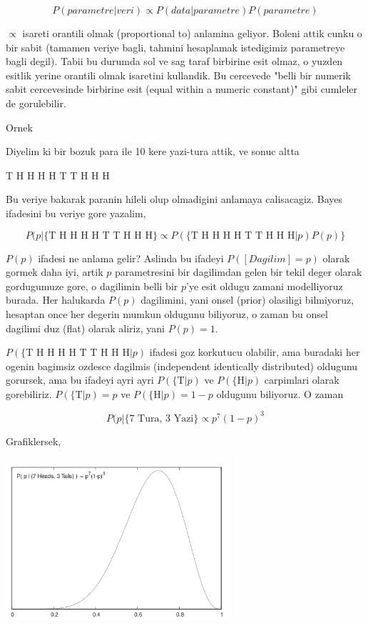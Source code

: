 \documentclass[12pt,fleqn]{article}\usepackage{../common}
\begin{document}
$$ P(parametre | veri ) \propto P(data | parametre)P(parametre) $$

$\propto$ isareti orantili olmak (proportional to) anlamina geliyor. Boleni
attik cunku o bir sabit (tamamen veriye bagli, tahmini hesaplamak
istedigimiz parametreye bagli degil). Tabii bu durumda sol ve sag taraf
birbirine esit olmaz, o yuzden esitlik yerine orantili olmak isaretini
kullandik. Bu cercevede "belli bir numerik sabit cercevesinde birbirine
esit (equal within a numeric constant)" gibi cumleler de gorulebilir. 

Ornek

Diyelim ki bir bozuk para ile 10 kere yazi-tura attik, ve sonuc altta

T H H H H T T H H H

Bu veriye bakarak paranin hileli olup olmadigini anlamaya
calisacagiz. Bayes ifadesini bu veriye gore yazalim,

$$ P(p | \{ \textrm{T H H H H T T H H H} \} \propto 
P(\{ \textrm{T H H H H T T H H H} | p) P(p) \}
$$

$P(p)$ ifadesi ne anlama gelir? Aslinda bu ifadeyi $P([Dagilim] = p)$
olarak gormek daha iyi, artik $p$ parametresini bir dagilimdan gelen bir
tekil deger olarak gordugumuze gore, o dagilimin belli bir $p$'ye esit
oldugu zamani modelliyoruz burada. Her halukarda $P(p)$ dagilimini, yani
onsel (prior) olasiligi bilmiyoruz, hesaptan once her degerin mumkun
oldugunu biliyoruz, o zaman bu onsel dagilimi duz (flat) olarak aliriz,
yani $P(p) = 1$. 

$P(\{\textrm{T H H H H T T H H H} | p)$ ifadesi goz korkutucu olabilir, ama
buradaki her ogenin bagimsiz ozdesce dagilmis (independent identically
distributed) oldugunu gorursek, ama bu ifadeyi ayri ayri
$P(\{\textrm{T}|p)$ ve $P(\{\textrm{H}|p)$ carpimlari olarak gorebiliriz. $P(\{\textrm{T}|p) = p$ ve 
$P(\{\textrm{H}|p)=1-p$ oldugunu biliyoruz. O zaman 

$$ P(p | \{ \textrm{7 Tura, 3 Yazi} \} \propto
p^7(1-p)^3
$$

Grafiklersek, 

\includegraphics[height=6cm]{05_01.png}
\end{document}
